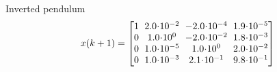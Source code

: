 \documentclass{beamer}
\begin{document}
\begin{frame}{Inverted pendulum}
   \vspace{-1pt}
   {\footnotesize
   \begin{align*}
   x(k+1)=\begin{bmatrix}
   1  \hspace{-2pt}&\hspace{-2pt}   2.0\hspace{-2pt}\cdot\hspace{-2pt} 10^{-2}  \hspace{-2pt}&\hspace{-2pt}  -2.0\hspace{-2pt}\cdot\hspace{-2pt} 10^{-4}  \hspace{-2pt}&\hspace{-2pt}  1.9\hspace{-2pt}\cdot\hspace{-2pt} 10^{-5}\\
   0  \hspace{-2pt}&\hspace{-2pt}   1.0\hspace{-2pt}\cdot\hspace{-2pt} 10^{0}   \hspace{-2pt}&\hspace{-2pt} -2.0\hspace{-2pt}\cdot\hspace{-2pt} 10^{-2}  \hspace{-2pt}&\hspace{-2pt}   1.8\hspace{-2pt}\cdot\hspace{-2pt} 10^{-3}\\
   0  \hspace{-2pt}&\hspace{-2pt}   1.0\hspace{-2pt}\cdot\hspace{-2pt} 10^{-5} \hspace{-2pt}&\hspace{-2pt}   1.0\hspace{-2pt}\cdot\hspace{-2pt} 10^{0} \hspace{-2pt}&\hspace{-2pt}   2.0\hspace{-2pt}\cdot\hspace{-2pt} 10^{-2}\\
   0  \hspace{-2pt}&\hspace{-2pt}   1.0\hspace{-2pt}\cdot\hspace{-2pt} 10^{-3}\hspace{-2pt}&\hspace{-2pt}  2.1\hspace{-2pt}\cdot\hspace{-2pt} 10^{-1}  \hspace{-2pt}&\hspace{-2pt}  9.8\hspace{-2pt}\cdot\hspace{-2pt} 10^{-1}

\end{bmatrix}
\end{align*}}
\end{frame}
\end{document}
